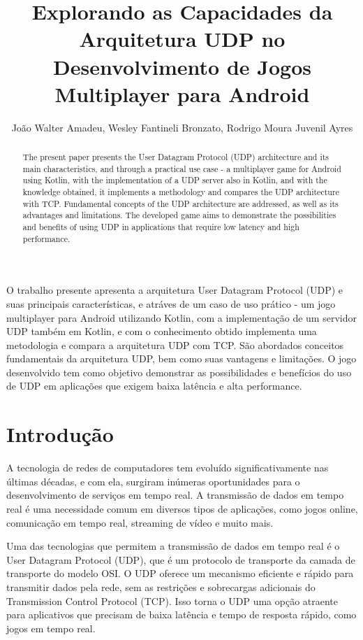 \documentclass[12pt]{article}
\title{Explorando as Capacidades da Arquitetura UDP no\\ Desenvolvimento de Jogos Multiplayer para Android}
\author{João Walter Amadeu\inst{1}, Wesley Fantineli Bronzato\inst{1}, Rodrigo Moura Juvenil Ayres\inst{1} }
\begin{document}
\maketitle

\begin{abstract}
  The present paper presents the User Datagram Protocol (UDP) architecture and its main characteristics, and through a practical use case - a multiplayer game for Android using Kotlin, with the implementation of a UDP server also in Kotlin, and with the knowledge obtained, it implements a methodology and compares the UDP architecture with TCP. Fundamental concepts of the UDP architecture are addressed, as well as its advantages and limitations. The developed game aims to demonstrate the possibilities and benefits of using UDP in applications that require low latency and high performance.
\end{abstract}

\begin{resumo}
  O trabalho presente apresenta a arquitetura User Datagram Protocol (UDP) e suas principais características, e atráves de um caso de uso prático - um jogo multiplayer para Android utilizando Kotlin, com a implementação de um servidor UDP também em Kotlin, e com o conhecimento obtido implementa uma metodologia e compara a arquitetura UDP com TCP. São abordados conceitos fundamentais da arquitetura UDP, bem como suas vantagens e limitações. O jogo desenvolvido tem como objetivo demonstrar as possibilidades e benefícios do uso de UDP em aplicações que exigem baixa latência e alta performance.
\end{resumo}


\section{Introdução}
A tecnologia de redes de computadores tem evoluído significativamente nas últimas décadas, e com ela, surgiram inúmeras oportunidades para o desenvolvimento de serviços em tempo real. A transmissão de dados em tempo real é uma necessidade comum em diversos tipos de aplicações, como jogos online, comunicação em tempo real, streaming de vídeo e muito mais.

Uma das tecnologias que permitem a transmissão de dados em tempo real é o User Datagram Protocol (UDP), que é um protocolo de transporte da camada de transporte do modelo OSI. O UDP oferece um mecanismo eficiente e rápido para transmitir dados pela rede, sem as restrições e sobrecargas adicionais do Transmission Control Protocol (TCP). Isso torna o UDP uma opção atraente para aplicativos que precisam de baixa latência e tempo de resposta rápido, como jogos em tempo real.
\end{document}
